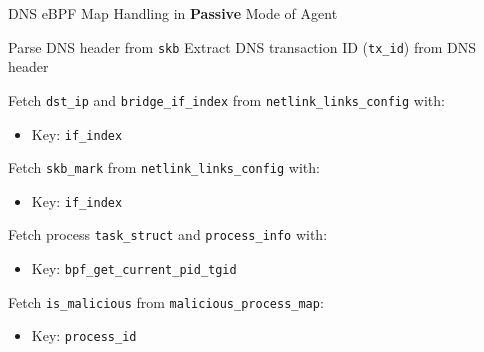 \documentclass [11pt, proquest] {uwthesis}[2020/02/24]
\begin{document}
\begin{algorithm}[H]
\caption{DNS eBPF Map Handling in \textbf{Passive} Mode of Agent}
\label{sec:alg5}

\small
{}


Parse DNS header from \texttt{skb}\;
Extract DNS transaction ID (\texttt{tx\_id}) from DNS header\;

Fetch \texttt{dst\_ip} and \texttt{bridge\_if\_index} from \texttt{netlink\_links\_config} with:
\begin{itemize}[nosep]
    \item Key: \texttt{if\_index}
\end{itemize}
Fetch \texttt{skb\_mark} from \texttt{netlink\_links\_config} with:
\begin{itemize}[nosep]
    \item Key: \texttt{if\_index}
\end{itemize}

Fetch process \texttt{task\_struct} and \texttt{process\_info} with:
\begin{itemize}[nosep]
    \item Key: \texttt{bpf\_get\_current\_pid\_tgid}
\end{itemize}

Fetch \texttt{is\_malicious} from \texttt{malicious\_process\_map}:
\begin{itemize}[nosep]
    \item Key: \texttt{process\_id}
\end{itemize}

\end{algorithm}
\end{document}
